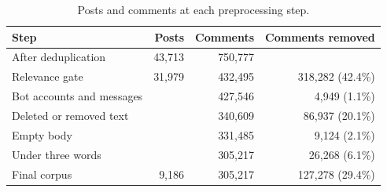\begin{table}[htbp]
\centering
\caption{Posts and comments at each preprocessing step.}
\label{tab:funnel}
\footnotesize
\setlength{\tabcolsep}{3pt}
\begin{tabularx}{\linewidth}{@{}>{\raggedright\arraybackslash}Xrrr@{}}
\toprule
Step & Posts & Comments & Comments removed \\
\midrule
After deduplication & 43,713 & 750,777 & \\
Relevance gate & 31,979 & 432,495 & 318,282 (42.4\%) \\
Bot accounts and messages & & 427,546 & 4,949 (1.1\%) \\
Deleted or removed text & & 340,609 & 86,937 (20.1\%) \\
Empty body & & 331,485 & 9,124 (2.1\%) \\
Under three words & & 305,217 & 26,268 (6.1\%) \\
\midrule
Final corpus & 9,186 & 305,217 & 127,278 (29.4\%) \\
\bottomrule
\end{tabularx}
\end{table}